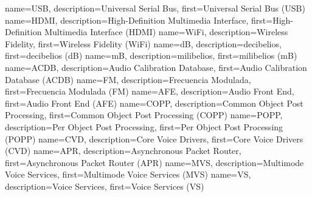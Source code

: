 {	
	name={USB},
	description={Universal Serial Bus},
	first={Universal Serial Bus (USB)}
}
{	
	name={HDMI},
	description={High-Definition Multimedia Interface},
	first={High-Definition Multimedia Interface (HDMI)}
}
{	
	name={WiFi},
	description={Wireless Fidelity},
	first={Wireless Fidelity (WiFi)}
}
{
	name={dB},
	description={decibelios},
	first={decibelios (dB)}
}
{
	name={mB},
	description={milibelios},
	first={milibelios (mB)}
}
{
	name={ACDB},
	description={Audio Calibration Database},
	first={Audio Calibration Database (ACDB)}
}
{
	name={FM},
	description={Frecuencia Modulada},
	first={Frecuencia Modulada (FM)}
}
{
	name={AFE},
	description={Audio Front End},
	first={Audio Front End (AFE)}
}
{
	name={COPP},
	description={Common Object Post Processing},
	first={Common Object Post Processing (COPP)}
}
{
	name={POPP},
	description={Per Object Post Processing},
	first={Per Object Post Processing (POPP)}
}
{
	name={CVD},
	description={Core Voice Drivers},
	first={Core Voice Drivers (CVD)}
}
{
	name={APR},
	description={Asynchronous Packet Router},
	first={Asynchronous Packet Router (APR)}
}
{
	name={MVS},
	description={Multimode Voice Services},
	first={Multimode Voice Services (MVS)}
}
{
	name={VS},
	description={Voice Services},
	first={Voice Services (VS)}
}